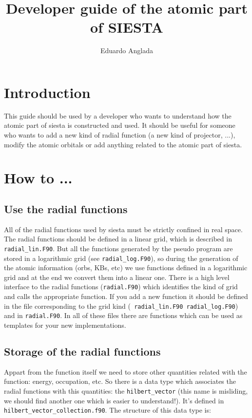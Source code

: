 \documentclass[12pt]{article}
\title{Developer guide of the atomic part of SIESTA}
\author{Eduardo Anglada}
\begin{document}
\maketitle
\tableofcontents

\section{Introduction}
This guide should be used by a developer who wants to understand how the atomic part of siesta is constructed and used. It should be useful for someone who wants to add a new kind of radial function (a new kind of projector, ...), modify the atomic orbitals or add anything related to the atomic part of siesta.

\section{How to ...}

\subsection{Use the radial functions}

All of the radial functions used by siesta must be strictly confined in real space. The radial functions should be defined in a linear grid, which is described in \verb+radial_lin.F90+. But all the functions generated by the pseudo program are stored in a logarithmic grid (see \verb+radial_log.F90+), so during the generation of the atomic information (orbs, KBs, etc) we use functions defined in a logarithmic grid and at the end we convert them into a linear one.  There is a high level interface to the radial functions (\verb+radial.F90+) which identifies the kind of grid and calls the appropriate function. If you add a new function it should be defined in the file corresponding to the grid kind (\verb+ radial_lin.F90 radial_log.F90+) and in \verb+radial.F90+. In all of these files there are functions which can be used as templates for your new implementations.

\subsection{Storage of the radial functions}
Appart from the function itself we need to store other quantities related with the function: energy, occupation, etc. So there is a data type which associates the radial functions with this quantities: the \verb+hilbert_vector+ (this name is misliding, we should find another one which is easier to understand!). It's defined in \verb|hilbert_vector_collection.f90|. The structure of this data type is: 
\end{document}
